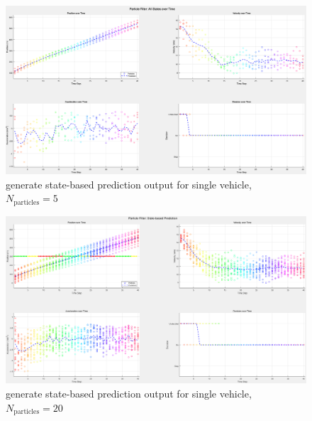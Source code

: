 \begin{figure}[H]
    \centering
    \includegraphics[width= 1\linewidth]{figures/Scenario 1.2.1-1, generate state-based prediction output for single vehicle.png}
    \caption{generate state-based prediction output for single vehicle, $N_\text{particles} = 5$}
    \label{fig: Scenario 1.2.1-1, generate state-based prediction output for single vehicle}
\end{figure}

\begin{figure}[H]
    \centering
    \includegraphics[width= 1\linewidth]{figures/Scenario 1.2.1-2, generate state-based prediction output for single vehicle.png}
    \caption{generate state-based prediction output for single vehicle, $N_\text{particles} = 20$}
    \label{fig: Scenario 1.2.1-2, generate state-based prediction output for single vehicle}
\end{figure}

